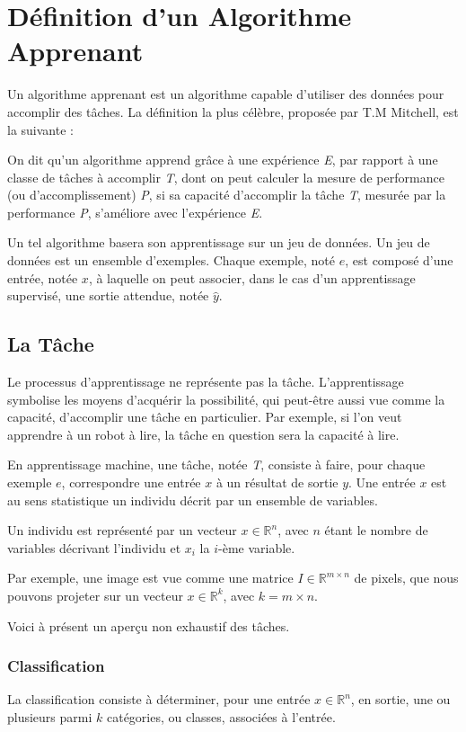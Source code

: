 \documentclass[a4paper, 11pt]{report}
\begin{document}
\section{Définition d'un Algorithme Apprenant}
Un algorithme apprenant est un algorithme capable d'utiliser des données pour accomplir des tâches. La définition la plus célèbre, proposée par T.M Mitchell, est la suivante :
\begin{displayquote}
	On dit qu'un algorithme apprend grâce à une expérience \emph{E}, par rapport à une classe de tâches à accomplir \emph{T}, dont on peut calculer la mesure de performance (ou d'accomplissement) \emph{P}, si sa capacité d'accomplir la tâche \emph{T}, mesurée par la performance \emph{P}, s'améliore avec l'expérience \emph{E}.
\end{displayquote}

Un tel algorithme basera son apprentissage sur un jeu de données. Un jeu de données est un ensemble d'exemples.
Chaque exemple, noté $e$, est composé d'une entrée, notée $x$, à laquelle on peut associer, dans le cas d'un apprentissage supervisé, une sortie attendue, notée $\hat{y}$.
\subsection{La Tâche}
Le processus d'apprentissage ne représente pas la tâche. L'apprentissage symbolise les moyens d'acquérir la possibilité, qui peut-être aussi vue comme la capacité, d'accomplir une tâche en particulier.
Par exemple, si l'on veut apprendre à un robot à lire, la tâche en question sera la capacité à lire.

En apprentissage machine, une tâche, notée \emph{T}, consiste à faire, pour chaque exemple $e$, correspondre une entrée $x$ à un résultat de sortie $y$.
Une entrée $x$ est au sens statistique un individu décrit par un ensemble de variables.
\begin{center}
	Un individu est représenté par un vecteur $x \in \mathbb{R}^n$, avec $n$ étant le nombre de variables décrivant l'individu et $x_i$ la $i$-ème variable.
\end{center}
Par exemple, une image est vue comme une matrice $I \in \mathbb{R}^{m \times n}$ de pixels, que nous pouvons projeter sur un vecteur $x \in \mathbb{R}^k$, avec $k = m \times n$.

Voici à présent un aperçu non exhaustif des tâches.
\subsubsection{Classification}
La classification consiste à déterminer, pour une entrée $x \in \mathbb{R}^n$, en sortie, une ou plusieurs parmi $k$ catégories, ou classes, associées à l'entrée.
\end{document}
